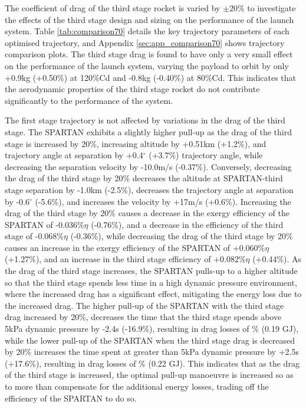 The coefficient of drag of the third stage rocket is varied by $\pm20\%$ to investigate the effects of the third stage design and sizing on the performance of the launch system. Table \ref{tab:comparison70} details the key trajectory parameters of each optimised trajectory, and Appendix \ref{sec:app_comparison70} shows trajectory comparison plots. The third stage drag is found to have only a very small effect on the performance of the launch system, varying the payload to orbit by only +0.9kg (+0.50\%) at 120\%Cd and -0.8kg (-0.40\%) at 80\%Cd. This indicates that the aerodynamic properties of the third stage rocket do not contribute significantly to the performance of the system. 

The first stage trajectory is not affected by variations in the drag of the third stage. 
The SPARTAN exhibits a slightly higher pull-up as the drag of the third stage is increased by 20\%, increasing altitude by +0.51km (+1.2\%), and trajectory angle at separation by +0.4$^\circ$ (+3.7\%) trajectory angle, while decreasing the separation velocity by -10.0m/s (-0.37\%). Conversely, decreasing the drag of the third stage by 20\% decreases the altitude at SPARTAN-third stage separation by -1.0km (-2.5\%), decreases the trajectory angle at separation by -0.6$^\circ$ (-5.6\%), and increases the velocity by +17m/s (+0.6\%). 
Increasing the drag of the third stage by 20\% causes a decrease in the exergy efficiency of the SPARTAN of -0.036\%$\eta$ (-0.76\%), and a decrease in the efficiency of the third stage of -0.068\%$\eta$ (-0.36\%), while decreasing the drag of the third stage by 20\% causes an increase in the exergy efficiency of the SPARTAN of +0.060\%$\eta$ (+1.27\%), and an increase in the third stage efficiency of +0.082\%$\eta$ (+0.44\%). 
As the drag of the third stage increases, the SPARTAN pulls-up to a higher altitude so that the third stage spends less time in a high dynamic pressure environment, where the increased drag has a significant effect, mitigating the energy loss due to the increased drag. The higher pull-up of the SPARTAN with the third stage drag increased by 20\%, decreases the time that the third stage spends above 5kPa dynamic pressure by -2.4s (-16.9\%), resulting in drag losses of \WDthreeCdThreeOneHundredTwentyNoReturn\% (0.19 GJ), while the lower pull-up of the SPARTAN when the third stage drag is decreased by 20\% increases the time spent at greater than 5kPa dynamic pressure by +2.5s (+17.6\%), resulting in drag losses of \WDthreeCdThreeEightyNoReturn\% (0.22 GJ). This indicates that as the drag of the third stage is increased, the optimal pull-up manoeuvre is increased so as to more than compensate for the additional energy losses, trading off the efficiency of the SPARTAN to do so. 



